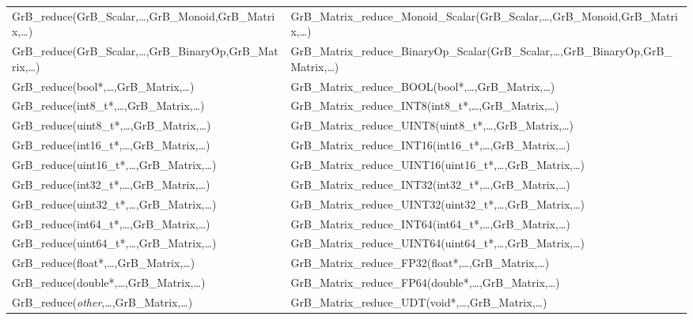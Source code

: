 \begin{landscape}
\begin{table}[htb]
{\begin{tabular}{l|l}
{\sf GrB\_reduce(GrB\_Scalar,\ldots,GrB\_Monoid,GrB\_Matrix,\ldots)}			& {\sf GrB\_Matrix\_reduce\_Monoid\_Scalar(GrB\_Scalar,\ldots,GrB\_Monoid,GrB\_Matrix,\ldots)} \\ 
{\sf GrB\_reduce(GrB\_Scalar,\ldots,GrB\_BinaryOp,GrB\_Matrix,\ldots)}			& {\sf GrB\_Matrix\_reduce\_BinaryOp\_Scalar(GrB\_Scalar,\ldots,GrB\_BinaryOp,GrB\_Matrix,\ldots)} \\ 
{\sf GrB\_reduce(bool*,\ldots,GrB\_Matrix,\ldots)}					& {\sf GrB\_Matrix\_reduce\_BOOL(bool*,\ldots,GrB\_Matrix,\ldots)} \\
{\sf GrB\_reduce(int8\_t*,\ldots,GrB\_Matrix,\ldots)}					& {\sf GrB\_Matrix\_reduce\_INT8(int8\_t*,\ldots,GrB\_Matrix,\ldots)} \\
{\sf GrB\_reduce(uint8\_t*,\ldots,GrB\_Matrix,\ldots)}					& {\sf GrB\_Matrix\_reduce\_UINT8(uint8\_t*,\ldots,GrB\_Matrix,\ldots)} \\
{\sf GrB\_reduce(int16\_t*,\ldots,GrB\_Matrix,\ldots)}					& {\sf GrB\_Matrix\_reduce\_INT16(int16\_t*,\ldots,GrB\_Matrix,\ldots)} \\
{\sf GrB\_reduce(uint16\_t*,\ldots,GrB\_Matrix,\ldots)}					& {\sf GrB\_Matrix\_reduce\_UINT16(uint16\_t*,\ldots,GrB\_Matrix,\ldots)} \\
{\sf GrB\_reduce(int32\_t*,\ldots,GrB\_Matrix,\ldots)}					& {\sf GrB\_Matrix\_reduce\_INT32(int32\_t*,\ldots,GrB\_Matrix,\ldots)} \\
{\sf GrB\_reduce(uint32\_t*,\ldots,GrB\_Matrix,\ldots)}					& {\sf GrB\_Matrix\_reduce\_UINT32(uint32\_t*,\ldots,GrB\_Matrix,\ldots)} \\
{\sf GrB\_reduce(int64\_t*,\ldots,GrB\_Matrix,\ldots)}					& {\sf GrB\_Matrix\_reduce\_INT64(int64\_t*,\ldots,GrB\_Matrix,\ldots)} \\
{\sf GrB\_reduce(uint64\_t*,\ldots,GrB\_Matrix,\ldots)}					& {\sf GrB\_Matrix\_reduce\_UINT64(uint64\_t*,\ldots,GrB\_Matrix,\ldots)} \\
{\sf GrB\_reduce(float*,\ldots,GrB\_Matrix,\ldots)}					& {\sf GrB\_Matrix\_reduce\_FP32(float*,\ldots,GrB\_Matrix,\ldots)} \\
{\sf GrB\_reduce(double*,\ldots,GrB\_Matrix,\ldots)}					& {\sf GrB\_Matrix\_reduce\_FP64(double*,\ldots,GrB\_Matrix,\ldots)} \\
{\sf GrB\_reduce(\emph{other},\ldots,GrB\_Matrix,\ldots)}				& {\sf GrB\_Matrix\_reduce\_UDT(void*,\ldots,GrB\_Matrix,\ldots)} \\ 
\hline


\end{tabular}}
\end{table}
\end{landscape}
